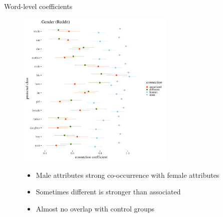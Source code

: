 \documentclass[10pt,ignorenonframetext,x11names, dvipsnames, bibspacing,natbib]{beamer}
\begin{document}
\begin{frame}{Word-level coefficients}

\begin{figure}[!htb]\centering
  \begin{minipage}{0.55\textwidth}
\includegraphics[width=7.5cm]{../images/visGenderReddit.png}
\end{minipage}
\begin{minipage}{0.4\textwidth}\footnotesize

\vspace{-4cm}

   \begin{itemize}
   \item Male attributes strong co-occurrence with female attributes
   \item Sometimes different is stronger than associated
   \item Almost no overlap with control groups
   \end{itemize}
   \end{minipage}
\end{figure}

\end{frame}
\end{document}
